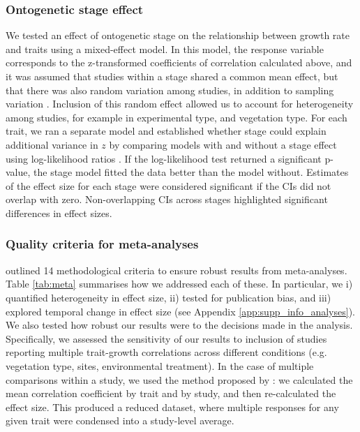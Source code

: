 \documentclass[a4paper,11pt]{article}
\begin{document}
\subsubsection*{Ontogenetic stage effect}\label{stage-effect}

We tested an effect of ontogenetic stage on the relationship between growth rate and traits using a mixed-effect model. In this model, the response variable corresponds to the z-transformed coefficients of correlation calculated above, and it was assumed that studies within a stage shared a common mean effect, but that there was also random variation among studies, in addition to sampling variation \citep{Zuur:2009cfa}. Inclusion of this random effect allowed us to account for heterogeneity among studies, for example in experimental type, and vegetation type. For each trait, we ran a separate model and established whether stage could explain additional variance in $z$ by comparing models with and without a stage effect using log-likelihood ratios \citep{Zuur:2009cfa}. If the log-likelihood test returned a significant p-value, the stage model fitted the data better than the model without. Estimates of the effect size for each stage were considered significant if the CIs did not overlap with zero. Non-overlapping CIs across stages highlighted significant differences in effect sizes.

\subsubsection*{Quality criteria for meta-analyses}

\citet{Koricheva:2014ku} outlined 14 methodological criteria to ensure robust results from meta-analyses. Table \ref{tab:meta} summarises how we addressed each of these. In particular, we i) quantified heterogeneity in effect size, ii) tested for publication bias, and iii) explored temporal change in effect size (see Appendix \ref{app:supp_info_analyses}).
We also tested how robust our results were to the decisions made in the analysis. Specifically, we assessed the sensitivity of our results to inclusion of studies reporting multiple trait-growth correlations across different conditions (e.g. vegetation type, sites, environmental treatment). In the case of multiple comparisons within a study, we used the method proposed by \citet{Borenstein:2009um}: we calculated the mean correlation coefficient by trait and by study, and then re-calculated the effect size. This produced a reduced dataset, where multiple responses for any given trait were condensed into a study-level average.
\end{document}

